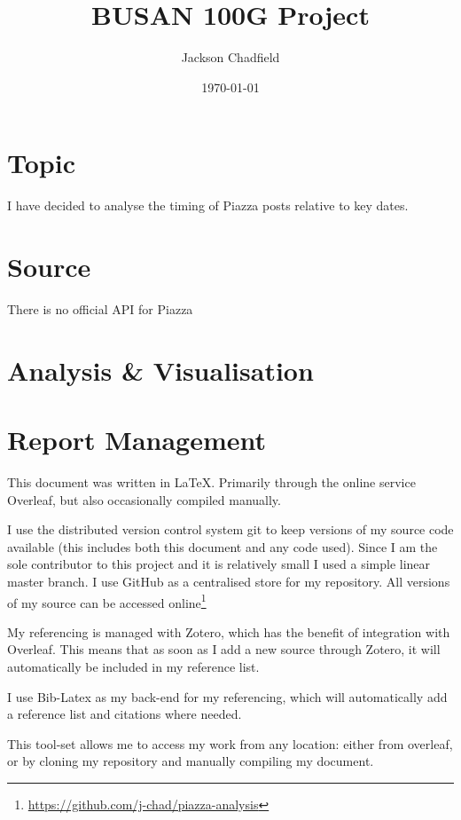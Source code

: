 \documentclass{article}
\title{BUSAN 100G Project}
\author{Jackson Chadfield}
\date{\today}
\begin{document}
\maketitle

\section{Topic}
I have decided to analyse the timing of Piazza posts relative to key dates.

\section{Source}
There is no official API for Piazza

\section{Analysis \& Visualisation}

\section{Report Management}
This document was written in \LaTeX. Primarily through the online service Overleaf, but also occasionally compiled manually.

I use the distributed version control system git to keep versions of my source code available (this includes both this document and any code used). Since I am the sole contributor to this project and it is relatively small I used a simple linear master branch. I use GitHub as a centralised store for my repository. All versions of my source can be accessed online\footnote{\url{https://github.com/j-chad/piazza-analysis}}

My referencing is managed with Zotero, which has the benefit of integration with Overleaf. This means that as soon as I add a new source through Zotero, it will automatically be included in my reference list. 

I use Bib-Latex as my back-end for my referencing, which will automatically add a reference list and citations where needed.

This tool-set allows me to access my work from any location: either from overleaf, or by cloning my repository and manually compiling my document.
\end{document}
